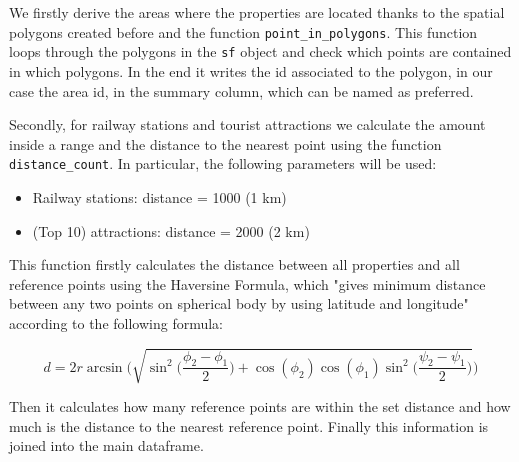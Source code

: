 We firstly derive the areas where the properties are located thanks to the spatial polygons created before and the function \texttt{point\_in\_polygons}.
This function loops through the polygons in the \texttt{sf} object and check which points are contained in which polygons. In the end it writes the id associated to the polygon, in our case the area id, in the summary column, which can be named as preferred.



Secondly, for railway stations and tourist attractions we calculate the amount inside a range and the distance to the nearest point using the function \texttt{distance\_count}. In particular, the following parameters will be used:

\begin{itemize}

    \item Railway stations: distance = 1000 (1 km)

    \item (Top 10) attractions: distance = 2000 (2 km)
    
\end{itemize}

This function firstly calculates the distance between all properties and all reference points using the Haversine Formula, which "gives  minimum  distance  between  any  two  points  on  spherical body by using latitude and longitude" \citep{ingole2013landmark} according to the following formula:

\begin{equation}
d = 2r \arcsin \Bigg(\sqrt{\sin^2\Big(\frac{\phi_2 - \phi_1}{2}\Big) + \cos(\phi_2)\cos(\phi_1)\sin^2\Big(\frac{\psi_2 - \psi_1}{2}\Big)}\Bigg)
\end{equation}


Then it calculates how many reference points are within the set distance and how much is the distance to the nearest reference point. Finally this information is joined into the main dataframe.



